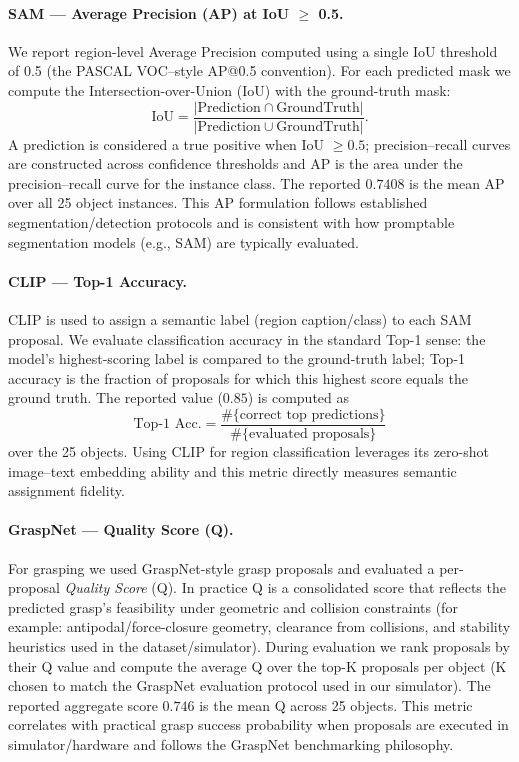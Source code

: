 \documentclass[12pt]{extarticle}
\begin{document}
\paragraph{SAM — Average Precision (AP) at IoU $\ge$ 0.5.}
We report region-level Average Precision computed using a single IoU threshold of 0.5 (the PASCAL VOC–style AP@0.5 convention). For each predicted mask we compute the Intersection-over-Union (IoU) with the ground-truth mask:
\[
\mathrm{IoU} = \frac{|\text{Prediction} \cap \text{GroundTruth}|}{|\text{Prediction} \cup \text{GroundTruth}|}.
\]
A prediction is considered a true positive when IoU $\ge 0.5$; precision–recall curves are constructed across confidence thresholds and AP is the area under the precision–recall curve for the instance class. The reported $0.7408$ is the mean AP over all 25 object instances. This AP formulation follows established segmentation/detection protocols and is consistent with how promptable segmentation models (e.g., SAM) are typically evaluated. \cite{kirillov2023segment,padilla2021metrics}

\paragraph{CLIP — Top-1 Accuracy.}
CLIP is used to assign a semantic label (region caption/class) to each SAM proposal. We evaluate classification accuracy in the standard Top-1 sense: the model's highest-scoring label is compared to the ground-truth label; Top-1 accuracy is the fraction of proposals for which this highest score equals the ground truth. The reported value ($0.85$) is computed as
\[
\text{Top-1 Acc.} = \frac{\#\{\text{correct top predictions}\}}{\#\{\text{evaluated proposals}\}}
\]
over the 25 objects. Using CLIP for region classification leverages its zero-shot image–text embedding ability and this metric directly measures semantic assignment fidelity. \cite{radford2021clip,openai_clip}

\paragraph{GraspNet — Quality Score (Q).}
For grasping we used GraspNet-style grasp proposals and evaluated a per-proposal \emph{Quality Score} (Q). In practice Q is a consolidated score that reflects the predicted grasp's feasibility under geometric and collision constraints (for example: antipodal/force-closure geometry, clearance from collisions, and stability heuristics used in the dataset/simulator). During evaluation we rank proposals by their Q value and compute the average Q over the top-K proposals per object (K chosen to match the GraspNet evaluation protocol used in our simulator). The reported aggregate score $0.746$ is the mean Q across 25 objects. This metric correlates with practical grasp success probability when proposals are executed in simulator/hardware and follows the GraspNet benchmarking philosophy. \cite{fang2020graspnet,wu2024grasping}
\end{document}
